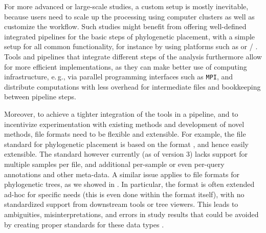 For more advanced or large-scale studies, a custom setup is mostly inevitable,
because users need to scale up the processing using computer clusters as well as customize the workflow.
Such studies might benefit from offering well-defined integrated pipelines for the basic steps of phylogenetic placement,
with a simple setup for all common functionality, for instance by using platforms such as
 \cite{Afgan2018} or / \cite{Gruning2018}.
Tools and pipelines that integrate different steps of the analysis furthermore allow for more efficient implementations,
as they can make better use of computing infrastructure,
e.\,g., via parallel programming interfaces such as \texttt{\acs{MPI}},
and distribute computations with less overhead for intermediate files and bookkeeping between pipeline steps.


Moreover, to achieve a tighter integration of the tools in a pipeline,
and to incentivize experimentation with existing methods and development of novel methods,
file formats need to be flexible and extensible.
For example, the  file standard for phylogenetic placement \cite{Matsen2012}
is based on the  format \cite{JsonMemo,JsonStandard}, and hence easily extensible.
The standard however currently (as of  version 3) lacks support for multiple samples per file,
and additional per-sample or even per-query annotations and other meta-data.
A similar issue applies to file formats for phylogenetic trees, as we showed in .
In particular, the  format is often extended ad-hoc for specific needs
(this is even done within the  format itself),
with no standardized support from downstream tools or tree viewers.
This leads to ambiguities, misinterpretations, and errors in study results
that could be avoided by creating proper standards for these data types \cite{Czech2017-tree-viewers}.

